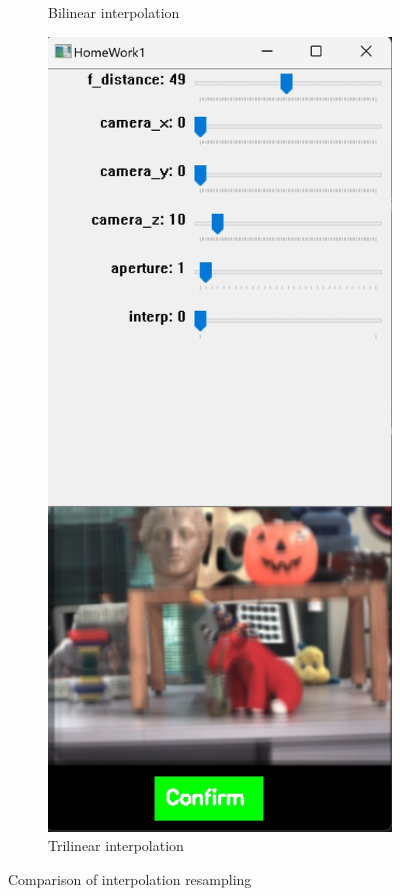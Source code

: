 \documentclass{article}
\begin{document}
\begin{figure}[h]
\begin{subfigure}{0.35\textwidth}
        \caption{Bilinear interpolation}
        \label{fig:bilinear}
    \end{subfigure}%
    \begin{subfigure}{0.35\textwidth}
        \centering
        \includegraphics[width=\textwidth]{interp_4.png} %
        \caption{Trilinear interpolation}
        \label{fig:trilinear}
    \end{subfigure}
    \caption{Comparison of interpolation resampling}
    \label{fig:interpolation}
\end{figure}
\end{document}
